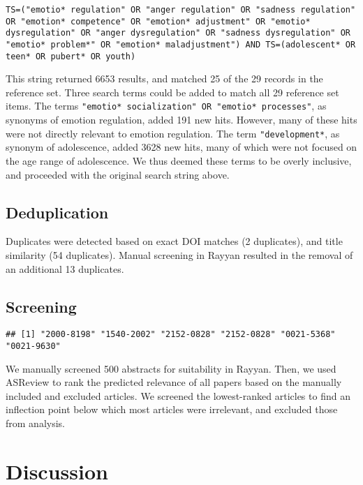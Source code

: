 \documentclass[
  english,
  man]{apa6}
\begin{document}
\begin{verbatim}
TS=("emotio* regulation" OR "anger regulation" OR "sadness regulation" OR "emotion* competence" OR "emotion* adjustment" OR "emotio* dysregulation" OR "anger dysregulation" OR "sadness dysregulation" OR "emotio* problem*" OR "emotion* maladjustment") AND TS=(adolescent* OR teen* OR pubert* OR youth)
\end{verbatim}

This string returned 6653 results, and matched 25 of the 29 records in the reference set. Three search terms could be added to match all 29 reference set items. The terms \texttt{"emotio*\ socialization"\ OR\ "emotio*\ processes"}, as synonyms of emotion regulation, added 191 new hits. However, many of these hits were not directly relevant to emotion regulation. The term \texttt{"development*}, as synonym of adolescence, added 3628 new hits, many of which were not focused on the age range of adolescence. We thus deemed these terms to be overly inclusive, and proceeded with the original search string above.

\hypertarget{deduplication}{%
\subsection{Deduplication}\label{deduplication}}

Duplicates were detected based on exact DOI matches (2 duplicates), and title similarity (54 duplicates). Manual screening in Rayyan resulted in the removal of an additional 13 duplicates.

\hypertarget{screening}{%
\subsection{Screening}\label{screening}}

\begin{verbatim}
## [1] "2000-8198" "1540-2002" "2152-0828" "2152-0828" "0021-5368" "0021-9630"
\end{verbatim}

We manually screened 500 abstracts for suitability in Rayyan. Then, we used ASReview to rank the predicted relevance of all papers based on the manually included and excluded articles. We screened the lowest-ranked articles to find an inflection point below which most articles were irrelevant, and excluded those from analysis.

\hypertarget{discussion}{%
\section{Discussion}\label{discussion}}
\end{document}
